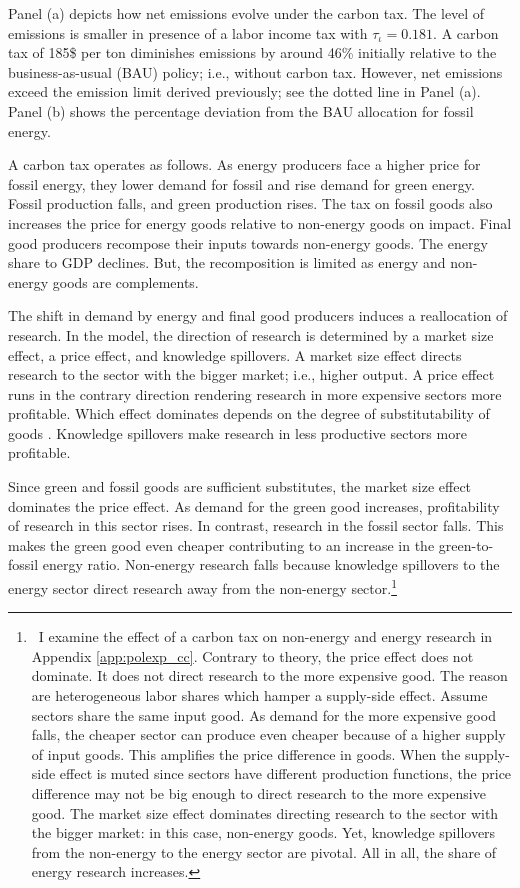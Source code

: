 Panel (a) depicts how net emissions evolve under the carbon tax. The level of emissions is smaller in presence of a labor income tax with $\tau_{\iota}=0.181$.   A carbon tax of 185\$ per ton diminishes emissions by around 46\% initially relative to the business-as-usual (BAU) policy; i.e., without carbon tax. However, net emissions exceed the emission limit  derived previously; see the dotted line in Panel (a). Panel (b) shows the percentage deviation from the BAU allocation for fossil energy.

A carbon tax operates as follows. As energy producers face a higher price for fossil energy, they lower demand for fossil and rise demand for green energy. Fossil production falls, and green production rises.
The tax on fossil goods also increases the price for energy goods relative to non-energy goods on impact. Final good producers recompose their inputs towards non-energy goods. The energy share to GDP declines.  But, the recomposition is limited as energy and non-energy goods are complements. 

The shift in demand by energy and final good producers induces a reallocation of research. In the model, the direction of research is determined by a market size effect, a price effect, and knowledge spillovers. 
A market size effect directs research to the sector with the bigger market; i.e., higher output. A price effect runs in the contrary direction rendering research in more expensive sectors more profitable. Which effect dominates depends on the degree of substitutability of goods \citep{Acemoglu2002DirectedChange, Hemous2021DirectedEconomics}. Knowledge spillovers make research in less productive sectors more profitable.

Since green and fossil goods are sufficient substitutes, the market size effect dominates the price effect. As demand for the green good increases, profitability of research in  this sector rises. In contrast, research in the fossil sector falls. This makes the green good even cheaper contributing to an increase in the green-to-fossil energy ratio.
Non-energy research falls because knowledge spillovers to the energy sector direct research away from the non-energy sector.\footnote{\ I examine the effect of a carbon tax on non-energy and energy research in Appendix \ref{app:polexp_cc}. Contrary to theory, the price effect does not dominate. It does not direct research to the more expensive good. The reason are heterogeneous labor shares which hamper a supply-side effect. Assume sectors share the same input good. As demand for the more expensive good falls, the cheaper sector can produce even cheaper because of a higher supply of input goods. This amplifies the price difference in goods. When the supply-side effect is muted since sectors have different production functions, the price difference may not be big enough to direct research to the more expensive good. The market size effect dominates directing research to the sector with the bigger market: in this case, non-energy goods. Yet, knowledge spillovers from the non-energy to the energy sector are pivotal. All in all, the share of energy research increases.}

